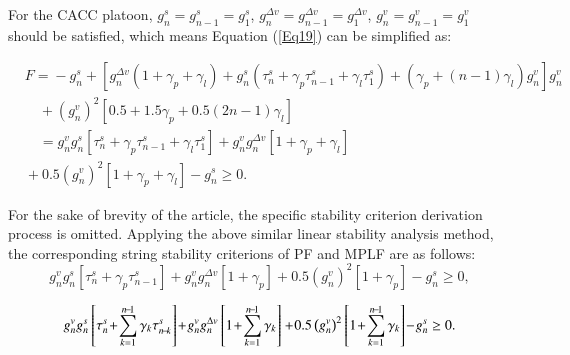 \documentclass[journal]{IEEEtran}
\begin{document}
For the CACC platoon, $g_n^s=g_{n-1}^s=g_1^s$,  $g_n^{\Delta v}=g_{n-1}^{\Delta v}=g_1^{\Delta v}$, $g_n^v=g_{n-1}^v=g_1^v$ should be satisfied, which means Equation (\ref{Eq19}) can be simplified as:

\begin{small}
\begin{equation}
\begin{aligned}
&F\!=\!\!-\!g_{n}^{s}\!+\!\left[g_{n}^{\Delta v}\left(1\!+\!\gamma_{p}\!+\!\gamma_{l}\right)\!+\!g_{n}^{s}\left(\tau_{n}^{s}\!+\!\gamma_{p} \tau_{n\!-\!1}^{s}\!+\!\gamma_{l} \tau_{1}^{s}\right)\!+\!\left(\gamma_{p}\!+\!(n\!\!-\!\!1) \gamma_{l}\right) g_{n}^{v}\right] g_{n}^{v} \\
&\quad\!+\!\left(g_{n}^{v}\right)^{2}\left[0.5\!+\!1.5 \gamma_{p}\!+\!0.5(2 n\!-\!1) \gamma_{l}\right] \\
&\quad=g_{n}^{v} g_{n}^{s}\left[\tau_{n}^{s}\!+\!\gamma_{p} \tau_{n\!-\!1}^{s}\!+\!\gamma_{l} \tau_{1}^{s}\right]\!+\!g_{n}^{v} g_{n}^{\Delta v}\left[1\!+\!\gamma_{p}\!+\!\gamma_{l}\right] \\
&  \!+\!0.5\left(g_{n}^{v}\right)^{2}\left[1\!+\!\gamma_{p}\!+\!\gamma_{l}\right]\!-\!g_{n}^{s} \geq 0.
\end{aligned}
\label{Eq70}
\end{equation}

\end{small}

For the sake of brevity of the article, the specific stability criterion derivation process is omitted. Applying the above similar linear stability analysis method, the corresponding string stability criterions of PF and MPLF are as follows:
\begin{equation}
g_{n}^{v} g_{n}^{s}\left[\tau_{n}^{s}\!+\!\gamma_{p} \tau_{n\!-\!1}^{s}\right]\!+\!g_{n}^{v} g_{n}^{\Delta v}\left[1\!+\!\gamma_{p}\right]\!+\!0.5\left(g_{n}^{v}\right)^{2}\left[1\!+\!\gamma_{p}\right]\!-\!g_{n}^{s} \geq 0,
\label{Eq21}
\end{equation}

\begin{small}
\begin{equation}
g_{n}^{v} g_{n}^{s}\left[\tau_{n}^{s}\!+\!\sum_{k=1}^{n\!-\!1} \gamma_{k} \tau_{n\!-\!k}^{s}\right]\!+\!g_{n}^{v} g_{n}^{\Delta v}\left[1\!+\!\sum_{k=1}^{n\!-\!1} \gamma_{k}\right]
\\\!+\!0.5\left(g_{n}^{v}\right)^{2}\left[1\!+\!\sum_{k=1}^{n\!-\!1} \gamma_{k}\right]\!-\!g_{n}^{s} \geq 0.
\label{Eq22}
\end{equation}
\end{small}
\end{document}
